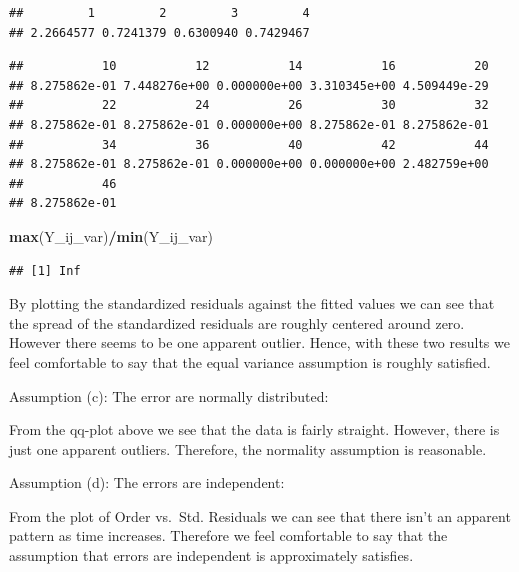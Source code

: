 \documentclass[12pt,]{article}
\newenvironment{Shaded}{\begin{snugshade}}{\end{snugshade}}
\newcommand{\KeywordTok}[1]{\textcolor[rgb]{0.13,0.29,0.53}{\textbf{#1}}}
\newcommand{\StringTok}[1]{\textcolor[rgb]{0.31,0.60,0.02}{#1}}
\newcommand{\OperatorTok}[1]{\textcolor[rgb]{0.81,0.36,0.00}{\textbf{#1}}}
\newcommand{\NormalTok}[1]{#1}
\begin{document}
\begin{verbatim}
##         1         2         3         4 
## 2.2664577 0.7241379 0.6300940 0.7429467
\end{verbatim}

\begin{Shaded}
\end{Shaded}

\begin{verbatim}
##           10           12           14           16           20 
## 8.275862e-01 7.448276e+00 0.000000e+00 3.310345e+00 4.509449e-29 
##           22           24           26           30           32 
## 8.275862e-01 8.275862e-01 0.000000e+00 8.275862e-01 8.275862e-01 
##           34           36           40           42           44 
## 8.275862e-01 8.275862e-01 0.000000e+00 0.000000e+00 2.482759e+00 
##           46 
## 8.275862e-01
\end{verbatim}

\begin{Shaded}
\begin{Highlighting}[]
\KeywordTok{max}\NormalTok{(Y_ij_var)}\OperatorTok{/}\KeywordTok{min}\NormalTok{(Y_ij_var)}
\end{Highlighting}
\end{Shaded}

\begin{verbatim}
## [1] Inf
\end{verbatim}

By plotting the standardized residuals against the fitted values we can
see that the spread of the standardized residuals are roughly centered
around zero. However there seems to be one apparent outlier. Hence, with
these two results we feel comfortable to say that the equal variance
assumption is roughly satisfied.

Assumption (c): The error are normally distributed:

From the qq-plot above we see that the data is fairly straight. However,
there is just one apparent outliers. Therefore, the normality assumption
is reasonable.

Assumption (d): The errors are independent:

From the plot of Order vs.~Std. Residuals we can see that there isn't an
apparent pattern as time increases. Therefore we feel comfortable to say
that the assumption that errors are independent is approximately
satisfies.
\end{document}
